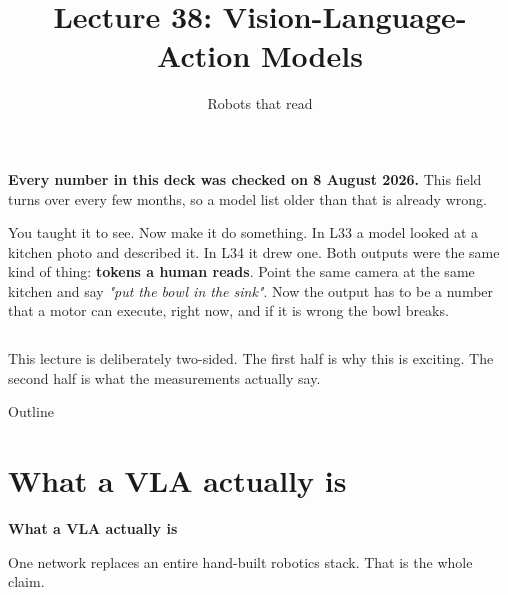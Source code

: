 \documentclass[aspectratio=169]{beamer}
\title{Lecture 38: Vision-Language-Action Models}
\subtitle{Robots that read}
\date{}
\begin{document}
\begin{frame}
  \titlepage
  \vskip -8pt
  \begin{center}
    \footnotesize\color{armred}\textbf{Every number in this deck was checked on 8 August 2026.}
    This field turns over every few months, so a model list older than that is already wrong.
  \end{center}
\end{frame}

\begin{frame}{You taught it to see. Now make it do something.}
  \small
  In L33 a model looked at a kitchen photo and described it. In L34 it drew one. Both
  outputs were the same kind of thing: \textbf{tokens a human reads}.
  \vskip 6pt
  Point the same camera at the same kitchen and say \emph{"put the bowl in the sink"}. Now
  the output has to be a number that a motor can execute, right now, and if it is wrong the
  bowl breaks.
  \vskip 8pt
  \begin{columns}[T]
  \end{columns}
  \vskip 8pt
  \footnotesize
  \centering
  This lecture is deliberately two-sided. The first half is why this is exciting. The
  second half is what the measurements actually say.
\end{frame}

\begin{frame}{Outline}
  \tableofcontents
\end{frame}

\section{What a VLA actually is}

\begin{frame}[plain]
  \vfill
  \begin{center}
    {\Large\color{popblue}\textbf{What a VLA actually is}}\\[0.9em]
    \begin{minipage}{0.82\textwidth}\centering\small
      One network replaces an entire hand-built robotics stack. That is the whole claim.
    \end{minipage}
  \end{center}
  \vfill
\end{frame}
\end{document}
